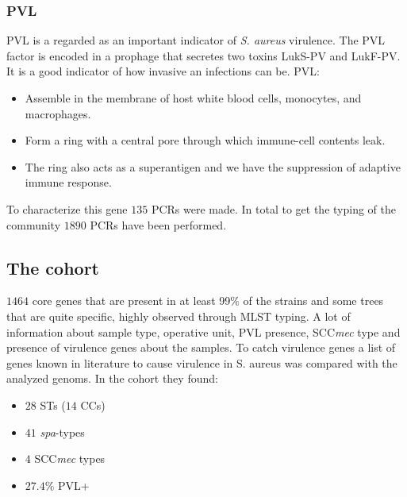         \subsubsection{PVL}
        PVL is a regarded as an important indicator of \emph{S. aureus} virulence.
        The PVL factor is encoded in a prophage that secretes two toxins LukS-PV and LukF-PV.
        It is a good indicator of how invasive an infections can be.
        PVL:

        \begin{multicols}{2}
            \begin{itemize}
                \item Assemble in the membrane of host white blood cells, monocytes, and macrophages.
                \item Form a ring with a central pore through which immune-cell contents leak.
                \item The ring also acts as a superantigen and we have the suppression of adaptive immune response.
            \end{itemize}
        \end{multicols}

        To characterize this gene $135$ PCRs were made.
        In total to get the typing of the community $1890$ PCRs have been performed.

    \subsection{The cohort}
    $1464$ core genes that are present in at least 99$\%$ of the strains and some trees that are quite specific, highly observed through MLST typing.
    A lot of information about sample type, operative unit, PVL presence, SCC\emph{mec} type and presence of virulence genes about the samples.
    To catch virulence genes a list of genes known in literature to cause virulence in S. aureus was compared with the analyzed genoms.
    In the cohort they found:

    \begin{multicols}{2}
    \begin{itemize}
        \item $28$ STs ($14$ CCs)
        \item $41$ \emph{spa}-types
        \item $4$ SCC\emph{mec} types
        \item $27.4\%$ PVL+
    \end{itemize}
    \end{multicols}

